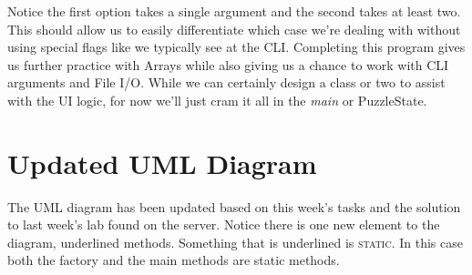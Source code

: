 \documentclass[nobib]{tufte-handout}
\begin{document}
Notice the first option takes a single argument and the second takes at least two. This should allow us to easily differentiate which case we're dealing with without using special flags like we typically see at the CLI. Completing this program gives us further practice with Arrays\sidenote{\url{}} while also giving us a chance to work with CLI arguments and File I/O.  While we can certainly design a class or two to assist with the UI logic, for now we'll just cram it all in the \textit{main} or PuzzleState. 



\newpage \thispagestyle{empty}

\section{ Updated UML Diagram }

The UML diagram has been updated based on this week's tasks and the solution to last week's lab found on the server. Notice there is one new element to the diagram, underlined methods. Something that is underlined is \textsc{static}. In this case both the factory and the main methods are static methods. 
\end{document}
